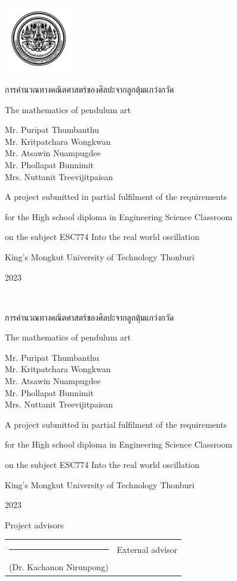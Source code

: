 \documentclass[a4paper, oneside]{memoir}
\newcommand{\thaiheader}{การคำนวณทางคณิตศาสตร์ของศิลปะจากลูกตุ้มแกว่งกวัด}
\newcommand{\engheader}{The mathematics of pendulum art}
\newcommand{\engauthor}{
    Mr. Puripat Thumbanthu \\ Mr. Kritpatchara Wongkwan \\ Mr. Atsawin Nuampugdee \\ Mr. Phollapat Bunnimit \\ Mrs. Nuttanit Treevijitpaisan
}
\begin{document}
\pagestyle{empty}
\begin{center}
    \includegraphics[width = 3cm]{logo/kmuttlogo.png}
\end{center}
\vspace{1em}
\begin{center}
    \thaiheader

    \engheader

    \vfill
    \engauthor

    \vfill
    A project submitted in partial fulfilment of the requirements

    for the High school diploma in Engineering Science Classroom

    on the subject ESC774 Into the real world oscillation

    King's Mongkut University of Technology Thonburi

    2023
\end{center}
\newpage \ \newpage

\setlrmarginsandblock{4cm}{2cm}{*}
\checkandfixthelayout

\begin{center}
    \thaiheader

    \engheader
    
    \vfill
    \engauthor

    \vfill
    A project submitted in partial fulfilment of the requirements

    for the High school diploma in Engineering Science Classroom

    on the subject ESC774 Into the real world oscillation

    King's Mongkut University of Technology Thonburi
    
    2023
    \vfill
\end{center}

Project advisors
\vspace{1em}

\begin{tabular}{m{} l}
    \centering\rule{0.5\textwidth}{1pt} & External advisor \\
    \centering(Dr. Kachanon Nirunpong) & \\ [1em]
\end{tabular}
\end{document}
